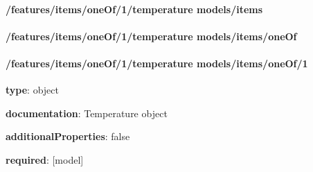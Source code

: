 \begin{itemized}
\paragraph{/features/items/oneOf/1/temperature models/items} \begin{itemized}
\end{itemized}\end{itemized}\paragraph{/features/items/oneOf/1/temperature models/items/oneOf} \begin{itemized}
\end{itemized}\paragraph{/features/items/oneOf/1/temperature models/items/oneOf/1} \begin{itemized}
\item {\bf type}: object
\item {\bf documentation}: Temperature object
\item {\bf additionalProperties}: false
\item {\bf required}: [model]\end{itemized}
